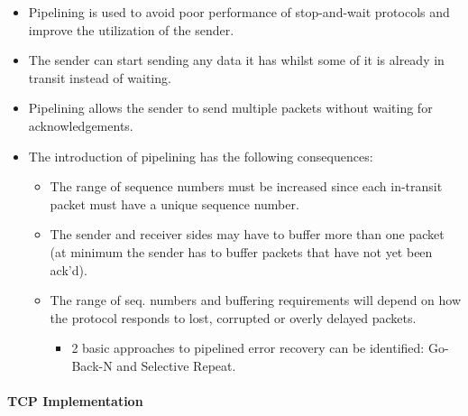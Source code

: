 \documentclass{article}
\begin{document}
\begin{itemize}
    \item Pipelining is used to avoid poor performance of stop-and-wait protocols and improve the utilization of the sender.
    \item The sender can start sending any data it has whilst some of it is already in transit instead of waiting.
    \item Pipelining allows the sender to send multiple packets without waiting for acknowledgements.
    \item The introduction of pipelining has the following consequences:
    \begin{itemize}
        \item The range of sequence numbers must be increased since each in-transit packet must have a unique sequence number.
        \item The sender and receiver sides may have to buffer more than one packet (at minimum the sender has to buffer packets that have not yet been ack'd).
        \item The range of seq. numbers and buffering requirements will depend on how the protocol responds to lost, corrupted or overly delayed packets.
        \begin{itemize}
            \item 2 basic approaches to pipelined error recovery can be identified: Go-Back-N and Selective Repeat.
        \end{itemize}
    \end{itemize}
\end{itemize}

\paragraph{TCP Implementation}
\end{document}
